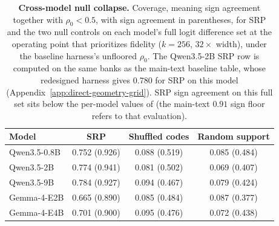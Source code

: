 \begin{table}[!tbp]
\caption{\textbf{Cross-model null collapse.}
Coverage, meaning sign agreement together with \(\rho_0<0.5\), with sign
agreement in parentheses, for SRP and the two null controls on each
model's full logit difference set at the operating point that prioritizes
fidelity (\(k=256\), \(32\times\) width),
under the baseline harness's unfloored \(\rho_0\). The Qwen3.5-2B SRP
row is computed on the same banks as the main-text baseline table, whose
redesigned harness gives 0.780 for SRP on this model
(Appendix~\ref{app:direct-geometry-grid}). SRP sign
agreement on this full set sits below the per-model values of
 (the main-text \(0.91\) sign floor refers to
that evaluation).}
\label{tab:app-cross-model-nulls}
\centering
\scriptsize
\setlength{\tabcolsep}{2.6pt}
\renewcommand{\arraystretch}{1.08}
\begin{tabular}{@{}lccc@{}}
\toprule
Model & SRP & Shuffled codes & Random support \\
\midrule
Qwen3.5-0.8B & 0.752 (0.926) & 0.088 (0.519) & 0.085 (0.484) \\
Qwen3.5-2B   & 0.774 (0.941) & 0.081 (0.502) & 0.069 (0.407) \\
Qwen3.5-9B   & 0.784 (0.927) & 0.094 (0.467) & 0.079 (0.424) \\
Gemma-4-E2B  & 0.665 (0.890) & 0.085 (0.484) & 0.087 (0.377) \\
Gemma-4-E4B  & 0.701 (0.900) & 0.095 (0.476) & 0.072 (0.438) \\
\bottomrule
\end{tabular}
\end{table}

